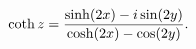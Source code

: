 \[\mathop{\coth\/}\nolimits z=\frac{\mathop{\sinh\/}\nolimits\!\left(2x\right)-i%
\mathop{\sin\/}\nolimits\!\left(2y\right)}{\mathop{\cosh\/}\nolimits\!\left(2x%
\right)-\mathop{\cos\/}\nolimits\!\left(2y\right)}.\]
